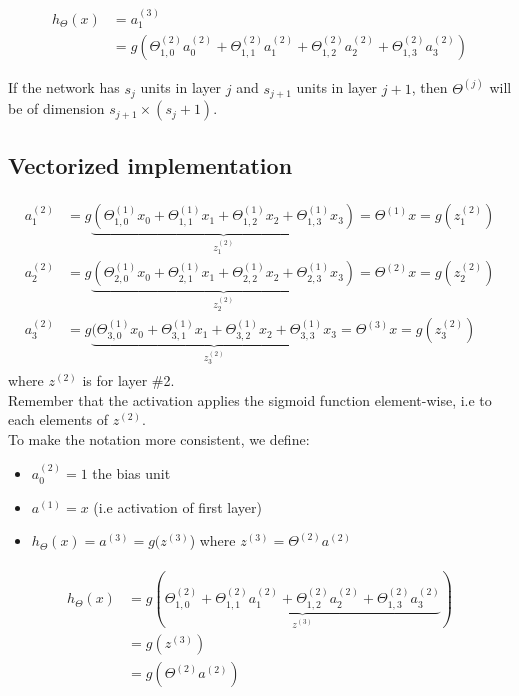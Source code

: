 \documentclass[a4paper,12pt]{report}
\begin{document}
\begin{align*}
h_{\Theta}(x) & = a_1 ^{(3)} \\
              & = g\left( \Theta_{1,0} ^{(2)}a_0 ^{(2)} + \Theta_{1,1} ^{(2)}a_1 ^{(2)} + \Theta_{1,2} ^{(2)}a_2 ^{(2)} + \Theta_{1,3} ^{(2)}a_3 ^{(2)} \right)
\end{align*}

If the network has $s_j$ units in layer $j$ and $s_{j+1}$ units in layer $j+1$, then $\Theta^{(j)}$ will be of dimension $s_{j+1} \times (s_j + 1)$.

\subsection{Vectorized implementation}
\begin{align*}
\begin{split}
a_1 ^{(2)} & = g \underbrace{(\Theta_{1,0} ^{(1)}x_0 +\Theta_{1,1} ^{(1)}x_1 +\Theta_{1,2} ^{(1)}x_2 + \Theta_{1,3} ^{(1)}x_3)}_\text{$z_1 ^{(2)}$} = \Theta^{(1)}x = g(z_1 ^{(2)})\\
a_2 ^{(2)} & = g\underbrace{(\Theta_{2,0} ^{(1)}x_0 +\Theta_{2,1} ^{(1)}x_1 +\Theta_{2,2} ^{(1)}x_2 + \Theta_{2,3} ^{(1)}x_3)}_\text{$z_2 ^{(2)}$} = \Theta^{(2)}x = g(z_2 ^{(2)})\\
a_3 ^{(2)} & = g\underbrace{(\Theta_{3,0} ^{(1)}x_0 +\Theta_{3,1} ^{(1)}x_1 +\Theta_{3,2} ^{(1)}x_2 + \Theta_{3,3} ^{(1)}x_3}_\text{$z_3 ^{(2)}$} = \Theta^{(3)}x = g(z_3 ^{(2)})
\end{split}
\end{align*}
where $z^{(2)}$ is for layer \#2. \\
Remember that the activation applies the sigmoid function element-wise, i.e to each elements of $z^{(2)}$. \\
To make the notation more consistent, we define:
\begin{itemize}
\item $a_0 ^{(2)} = 1$ the bias unit
\item $a^{(1)}=x$ (i.e activation of first layer)
\item $h_{\Theta}(x) = a^{(3)} = g(z^{(3)}$) where $z ^{(3)} = \Theta^{(2)} a^{(2)}$
\end{itemize}

\begin{align*}
\begin{split}
h_{\Theta}(x) & = g(\underbrace{\Theta_{1,0} ^{(2)} + \Theta_{1,1} ^{(2)} a_1 ^{(2)} + \Theta_{1,2} ^{(2)}  a_2 ^{(2)} + \Theta_{1,3} ^{(2)} a_3 ^{(2)}}_{\text{$z^{(3)}$}} ) \\
& = g(z^{(3)}) \\
& = g (\Theta ^{(2)} a^{(2)})
\end{split}
\end{align*}
\end{document}
